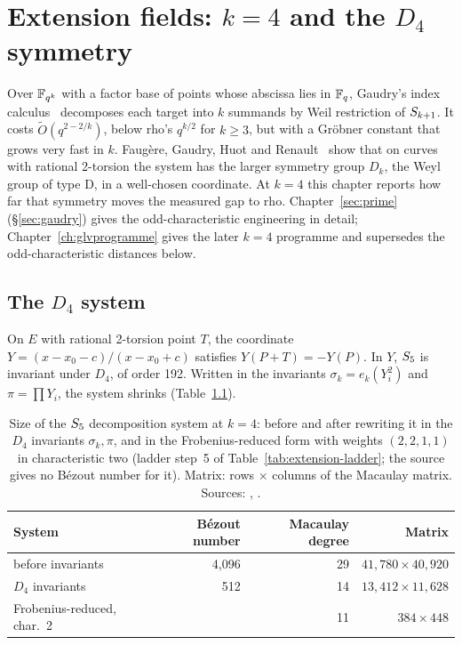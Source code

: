 \chapter{Extension fields: $k=4$ and the $D_4$ symmetry}\label{ch:extension}

Over $\mathbb{F}_{q^k}$ with a factor base of points whose abscissa lies in
$\mathbb{F}_q$, Gaudry's index calculus~\cite{gaudry2009} decomposes each target
into $k$ summands by Weil restriction of $S_{k+1}$. It costs
$\tilde O(q^{2-2/k})$, below rho's $q^{k/2}$ for $k\ge3$, but with a
Gröbner constant that grows very fast in $k$. Faugère, Gaudry, Huot and
Renault~\cite{fghr2014} show that on curves with rational 2-torsion the
system has the larger symmetry group $D_k$, the Weyl group of type D, in
a well-chosen coordinate. At $k=4$ this chapter reports how far that
symmetry moves the measured gap to rho. Chapter~\ref{sec:prime}
(\S\ref{sec:gaudry}) gives the odd-characteristic engineering in detail;
Chapter~\ref{ch:glvprogramme} gives the later $k=4$ programme and supersedes
the odd-characteristic distances below.

\section{The $D_4$ system}

On $E$ with rational 2-torsion point $T$, the coordinate
$Y=(x-x_0-c)/(x-x_0+c)$ satisfies $Y(P+T)=-Y(P)$. In $Y$, $S_{5}$ is
invariant under $D_4$, of order 192. Written in the invariants
$\sigma_k=e_k(Y_i^2)$ and $\pi=\prod Y_i$, the system shrinks
(Table~\ref{tab:extension-system}).

\begin{table}[t]
\centering\small
\begin{tabular}{@{}lrrr@{}}
\toprule
System & Bézout number & Macaulay degree & Matrix \\
\midrule
before invariants & 4{,}096 & 29 & $41{,}780\times40{,}920$ \\
$D_4$ invariants & 512 & 14 & $13{,}412\times11{,}628$ \\
\addlinespace
Frobenius-reduced, char.~2 & & 11 & $384\times448$ \\
\bottomrule
\end{tabular}
\caption[]{Size of the $S_{5}$ decomposition system at $k=4$: before and
after rewriting it in the $D_4$ invariants $\sigma_k,\pi$, and in the
Frobenius-reduced form with weights $(2,2,1,1)$ in characteristic two
(ladder step~5 of Table~\ref{tab:extension-ladder}; the source gives no
Bézout number for it). Matrix: rows $\times$ columns of the Macaulay
matrix. Sources: ,
.}
\label{tab:extension-system}
\end{table}

